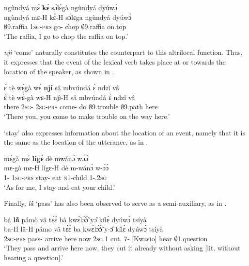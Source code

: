 \ea\label{AUXde1}
  \glll    ngùndyá mɛ́ {\bfseries kɛ́} sɔ́lɛ̀gà ngùndyá dyúwɔ̀ \\
          ngùndyá mɛ-H kɛ̀-H sɔ́lɛga ngùndyá dyúwɔ̀ \\
              $\emptyset$9.raffia 1\textsc{sg}-\textsc{prs} go-{\R} chop $\emptyset$9.raffia on.top\\
    \trans `The raffia, I go to chop the raffia on top.'
\z

{\itshape njì} `come' naturally constitutes the counterpart to this altrilocal function. Thus, it expresses that the event of the lexical verb takes place at or towards the location of the speaker, as shown in .

\ea\label{AUXde2}
  \glll ɛ́ tè wɛ̀gà wɛ́ {\bfseries njí} sâ mbvúndá ɛ́ ndzǐ vâ \\
        ɛ́ tè wɛ̀-gà wɛ-H njì-H sâ mbvúndá ɛ́ ndzǐ vâ \\
        {\LOC} there 2\textsc{sg}-{\CONTR} 2\textsc{sg}-\textsc{prs} come-{\R} do $\emptyset$9.trouble {\LOC} $\emptyset$9.path here\\
    \trans `There you, you come to make trouble on the way here.'
\z

 `stay' also expresses information about the location of an event, namely that it is the same as the location of the utterance, as in .
 

\ea\label{AUXde3}
  \glll  mɛ̀gà mɛ́ {\bfseries lígɛ́} dè mwánɔ̀ wɔ́ɔ̀ \\
        mɛ-gà mɛ-H lígɛ-H dè m-wánɔ̀ w-ɔ́ɔ̀ \\
          1-{\CONTR} 1\textsc{sg}-\textsc{prs} stay-{\R} eat \textsc{n}1-child 1-{\POSS}.2\textsc{sg}  \\
    \trans `As for me, I stay and eat your child.'
\z


\noindent Finally,  {\itshape lã̀} `pass' has also been observed to serve as a semi-auxiliary, as in .

\ea\label{AUXde4}
  \glll bá {\bfseries lã́} pámò vâ tɛ́ɛ̀ bà kwɛ̀lɔ̃́ɔ̃̀ yɔ̂ kílɛ̀ dyúwɔ̀  tsíyà \\
      ba-H lã̀-H pámo vâ tɛ́ɛ̀ ba kwɛ̀lɔ̃́ɔ̃̀ y-ɔ̂ kílɛ̀ dyúwɔ̀  tsíyà \\
       2\textsc{sg}-\textsc{prs} pass-{\R} arrive here now 2\textsc{sg}.{\PST}1 cut.{\COMPL} 7-{\OBJ} {\NEG}[Kwasio] hear $\emptyset$1.question\\
    \trans `They pass and arrive here now, they cut it already without asking [lit. without hearing a question].'
\z






